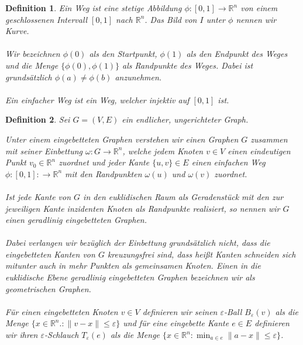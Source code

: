 \documentclass[a4paper, 12pt, twoside]{article}
\theoremstyle{Format1} %
\newtheorem{Def}{Definition}[section]       %
\begin{document}
\begin{Def}
	Ein \textit{Weg} ist eine stetige Abbildung $ \phi: [0,1] \to \mathbb{R}^n $ von einem geschlossenen Intervall $[0,1]$ nach $\mathbb{R}^n$.
	Das Bild von $I$ unter $\phi$ nennen wir \textit{Kurve}.
	\\
	\\
	Wir bezeichnen $\phi(0)$ als den \textit{Startpunkt}, $\phi(1)$ als den \textit{Endpunkt} des Weges und die Menge
	$\{\phi(0), \phi(1)\}$ als \textit{Randpunkte} des Weges. Dabei ist grundsätzlich $\phi(a) \neq \phi(b)$ anzunehmen.
	\\
	\\
	Ein \textit{einfacher Weg} ist ein Weg, welcher injektiv auf $[0,1]$ ist.
\end{Def}

\begin{Def}
	Sei $G=(V,E)$ ein endlicher, ungerichteter Graph.

	Unter einem \textit{eingebetteten Graphen} verstehen wir einen Graphen $G$
	zusammen mit seiner \textit{Einbettung} $\omega: G \to \mathbb{R}^n$, welche
	jedem Knoten $v \in V$ einen eindeutigen Punkt $v_0 \in \mathbb{R}^n$ zuordnet und jeder Kante $\{u,v\} \in E$
	einen einfachen Weg $\phi: [0,1]: \to \mathbb{R}^n$ mit den Randpunkten $\omega(u)$ und $\omega(v)$ zuordnet.
	\\
	\\
	Ist jede Kante von $G$ in den euklidischen Raum als Geradenstück mit den zur jeweiligen Kante inzidenten Knoten als Randpunkte realisiert, so
	nennen wir $G$ einen \textit{geradlinig eingebetteten Graphen}.
	\\
	\\
	Dabei verlangen wir bezüglich der Einbettung grundsätzlich nicht, dass die eingebetteten Kanten von $G$ \textit{kreuzungsfrei} sind,
	dass heißt Kanten schneiden sich mitunter auch in mehr Punkten als gemeinsamen Knoten.
	Einen in die euklidische Ebene geradlinig eingebetteten Graphen bezeichnen wir als \textit{geometrischen Graphen}.
	\\
	\\
	Für einen eingebetteten Knoten $v \in V$ definieren wir seinen \textit{$\varepsilon$-Ball} $B_{\varepsilon}(v)$ als die Menge
	$\{x \in \mathbb{R}^n.: \|v-x\| \leq \varepsilon\}$
	und für eine eingebette Kante $e \in E$ definieren wir ihren \textit{$\varepsilon$-Schlauch} $T_{\varepsilon}(e)$ als die Menge
	$\{x \in \mathbb{R}^n: \min_{a \in e}\|a-x\| \leq \varepsilon\}$.
\end{Def}
\end{document}

